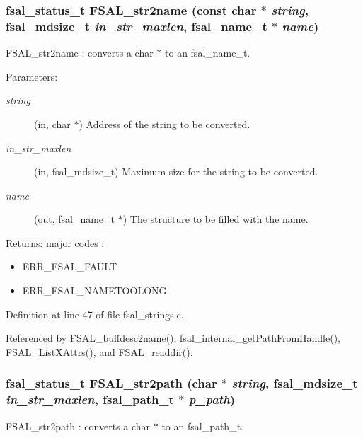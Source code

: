 \subsubsection{\setlength{\rightskip}{0pt plus 5cm}fsal\_\-status\_\-t FSAL\_\-str2name (const char $\ast$ {\em string}, fsal\_\-mdsize\_\-t {\em in\_\-str\_\-maxlen}, fsal\_\-name\_\-t $\ast$ {\em name})}\label{group__FSALNameFunctions_ga0}


FSAL\_\-str2name : converts a char $\ast$ to an fsal\_\-name\_\-t.

\begin{Desc}
\item[Parameters:]
\begin{description}
\item[{\em string}](in, char $\ast$) Address of the string to be converted. \item[{\em in\_\-str\_\-maxlen}](in, fsal\_\-mdsize\_\-t) Maximum size for the string to be converted. \item[{\em name}](out, fsal\_\-name\_\-t $\ast$) The structure to be filled with the name.\end{description}
\end{Desc}
\begin{Desc}
\item[Returns:]major codes :\begin{itemize}
\item ERR\_\-FSAL\_\-FAULT\item ERR\_\-FSAL\_\-NAMETOOLONG \end{itemize}
\end{Desc}


Definition at line 47 of file fsal\_\-strings.c.

Referenced by FSAL\_\-buffdesc2name(), fsal\_\-internal\_\-get\-Path\-From\-Handle(), FSAL\_\-List\-XAttrs(), and FSAL\_\-readdir().
\subsubsection{\setlength{\rightskip}{0pt plus 5cm}fsal\_\-status\_\-t FSAL\_\-str2path (char $\ast$ {\em string}, fsal\_\-mdsize\_\-t {\em in\_\-str\_\-maxlen}, fsal\_\-path\_\-t $\ast$ {\em p\_\-path})}\label{group__FSALNameFunctions_ga1}


FSAL\_\-str2path : converts a char $\ast$ to an fsal\_\-path\_\-t.

